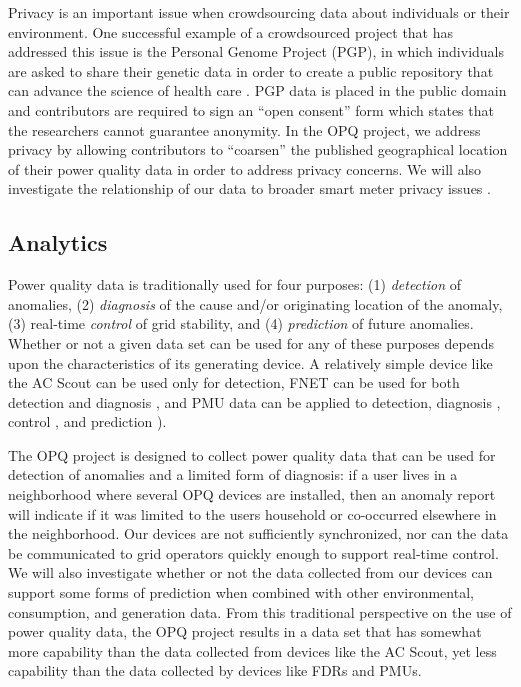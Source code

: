 \documentclass[11pt]{article}
\begin{document}
Privacy is an important issue when crowdsourcing data about individuals or their environment. One successful example of a crowdsourced project that has addressed this issue is the Personal Genome Project (PGP), in which individuals are asked to share their genetic data in order to create a public repository that can advance the science of health care \cite{Church2005}. PGP data is placed in the public domain and contributors are required to sign an ``open consent'' form which states that the researchers cannot guarantee anonymity. In the OPQ project, we address privacy by allowing contributors to ``coarsen'' the published geographical location of their power quality data in order to address privacy concerns.  We will also investigate the relationship of our data to broader smart meter privacy issues \cite{Balough2011}.

\subsection{Analytics}

Power quality data is traditionally used for four purposes: (1) {\em detection} of anomalies, (2) {\em diagnosis} of the cause and/or originating location of the anomaly, (3) real-time {\em control} of grid stability, and (4) {\em prediction} of future anomalies. Whether or not a given data set can be used for any of these purposes depends upon the characteristics of its generating device. A relatively simple device like the AC Scout can be used only for detection, FNET can be used for both detection and diagnosis \cite{Markham2012}, and PMU data can be applied to detection, diagnosis \cite{Zhao2009}, control \cite{Liu2010}, and prediction \cite{Liu2009,Gao2012}). 

The OPQ project is designed to collect power quality data that can be used for detection of anomalies and a limited form of diagnosis: if a user lives in a neighborhood where several OPQ devices are installed, then an anomaly report will indicate if it was limited to the users household or co-occurred elsewhere in the neighborhood. Our devices are not sufficiently synchronized, nor can the data be communicated to grid operators quickly enough to support real-time control. We will also investigate whether or not the data collected from our devices can support some forms of prediction when combined with other environmental, consumption, and generation data. From this traditional perspective on the use of power quality data, the OPQ project results in a data set that has somewhat more capability than the data collected from devices like the AC Scout, yet less capability than the data collected by devices like FDRs and PMUs. 
\end{document}
